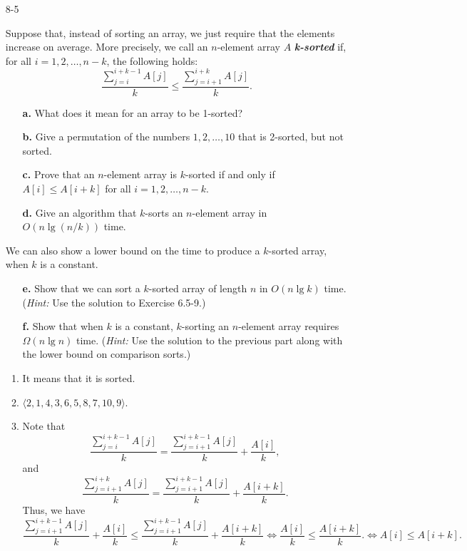 \documentclass{report}
\makeatletter
\renewenvironment{framed}{%
 \def\FrameCommand##1{\hskip\@totalleftmargin
 \fboxsep=\FrameSep\fbox{##1}}%
 \MakeFramed {\advance\hsize-\width
   \@totalleftmargin\z@ \linewidth\hsize
   \@setminipage}}%
 {\par\unskip\endMakeFramed}
\makeatother
\begin{document}
\begin{enumerate}
\item[8-5]{Suppose that, instead of sorting an array, we just require that the
elements increase on average. More precisely, we call an $n$-element array $A$
\textbf{\emph{k-sorted}} if, for all $i = 1, 2, \dots, n - k$, the following
holds:
\[
  \frac{\sum_{j = i}^{i + k - 1} A[j]}{k} \le \frac{\sum_{j = i + 1}^{i + k} A[j]}{k}.
\]
\begin{enumerate}
\item[\textbf{a.}]{What does it mean for an array to be 1-sorted?}
\item[\textbf{b.}]{Give a permutation of the numbers $1, 2, \dots, 10$ that is
2-sorted, but not sorted.}
\item[\textbf{c.}]{Prove that an $n$-element array is $k$-sorted if and only if
$A[i] \le A[i + k]$ for all $i = 1, 2, \dots, n - k$.}
\item[\textbf{d.}]{Give an algorithm that $k$-sorts an $n$-element array in
$O(n \lg (n/k))$ time.}
\end{enumerate}
We can also show a lower bound on the time to produce a $k$-sorted array, when
$k$ is a constant.

\begin{enumerate}
\item[\textbf{e.}]{Show that we can sort a $k$-sorted array of length $n$ in
$O(n \lg k)$ time. (\emph{Hint:} Use the solution to Exercise 6.5-9.)}
\item[\textbf{f.}]{Show that when $k$ is a constant, $k$-sorting an $n$-element
array requires $\Omega(n \lg n)$ time. (\emph{Hint:} Use the solution to the
previous part along with the lower bound on comparison sorts.)}
\end{enumerate}
}

\begin{framed}
\begin{enumerate}
\item It means that it is sorted.
\item $\langle 2, 1, 4, 3, 6, 5, 8, 7, 10, 9 \rangle$.
\item Note that
\[
  \frac{\sum_{j = i}^{i + k - 1} A[j]}{k} = \frac{\sum_{j = i + 1}^{i + k - 1} A[j]}{k} + \frac{A[i]}{k},
\]
and
\[
  \frac{\sum_{j = i + 1}^{i + k} A[j]}{k} = \frac{\sum_{j = i + 1}^{i + k - 1} A[j]}{k} + \frac{A[i + k]}{k}.
\]
Thus, we have
\[
  \frac{\sum_{j = i + 1}^{i + k - 1} A[j]}{k} + \frac{A[i]}{k} \le \frac{\sum_{j = i + 1}^{i + k - 1} A[j]}{k} + \frac{A[i + k]}{k}
  \iff \frac{A[i]}{k} \le \frac{A[i + k]}{k}.
  \iff A[i] \le A[i + k].
\]


\end{enumerate}
\end{framed}
\end{enumerate}
\end{document}
